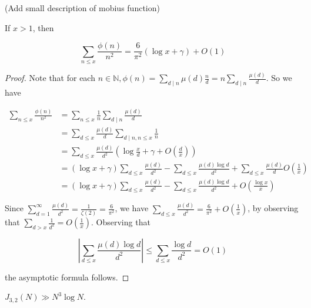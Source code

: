 (Add small description of mobius function)
\begin{lem}
 If $x>1$, then

$$
\sum_{n \leq x} \frac{\phi(n)}{n^{2}}=\frac{6}{\pi^{2}}\left(\log x+\gamma\right)+O(1)
$$
\end{lem}
\begin{proof}
 Note that for each $n \in \mathbb{N}, \phi(n)=\sum_{d \mid n} \mu(d) \frac{n}{d}=n \sum_{d \mid n} \frac{\mu(d)}{d}$. So we have

$$
\begin{aligned}
\sum_{n \leq x} \frac{\phi(n)}{n^{2}} & =\sum_{n \leq x} \frac{1}{n} \sum_{d \mid n} \frac{\mu(d)}{d} \\
& =\sum_{d \leq x} \frac{\mu(d)}{d} \sum_{d \mid n, n \leq x} \frac{1}{n} \\
& =\sum_{d \leq x} \frac{\mu(d)}{d^{2}}\left(\log \frac{x}{d}+\gamma+O\left(\frac{d}{x}\right)\right) \\
& =\left(\log x+\gamma\right) \sum_{d \leq x} \frac{\mu(d)}{d^{2}}-\sum_{d \leq x} \frac{\mu(d) \log d}{d^{2}}+\sum_{d \leq x} \frac{\mu(d)}{d} O\left(\frac{1}{x}\right) \\
& =\left(\log x+\gamma\right) \sum_{d \leq x} \frac{\mu(d)}{d^{2}}-\sum_{d \leq x} \frac{\mu(d) \log d}{d^{2}}+O\left(\frac{\log x}{x}\right)
\end{aligned}
$$

Since $\sum_{d=1}^{\infty} \frac{\mu(d)}{d^{2}}=\frac{1}{\zeta(2)}=\frac{6}{\pi^{2}}$, we have $\sum_{d \leq x} \frac{\mu(d)}{d^{2}}=\frac{6}{\pi^{2}}+O\left(\frac{1}{x}\right)$, by observing that $\sum_{d>x}\frac{1}{d^2}= O(\frac{1}{x})$. Observing that

$$
\left|\sum_{d \leq x} \frac{\mu(d) \log d}{d^{2}}\right| \leq \sum_{d \leq x} \frac{\log d}{d^{2}}=O(1)
$$

the asymptotic formula follows.
\end{proof}
\begin{thm}
$J_{3,2}(N) \gg N^{3} \log N$.
\end{thm}
